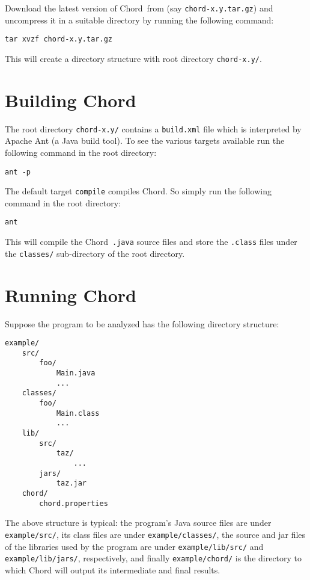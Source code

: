 \documentclass{article}
\providecommand\Chord{{Chord}}
\begin{document}
Download the latest version of \Chord\ from 
(say {\tt chord-x.y.tar.gz}) and uncompress it in a suitable directory by running the following command:

\begin{verbatim}
tar xvzf chord-x.y.tar.gz
\end{verbatim}

This will create a directory structure with root directory {\tt chord-x.y/}.

\texonly{\newpage}
\section{Building Chord}

The root directory {\tt chord-x.y/} contains a {\tt build.xml} file which is interpreted by
Apache Ant (a Java build tool).
To see the various targets available run the following command in the root directory:

\begin{verbatim}
ant -p
\end{verbatim}

The default target {\tt compile} compiles \Chord.  So simply run the following command in the
root directory:

\begin{verbatim}
ant
\end{verbatim}

This will compile the \Chord\ {\tt .java} source files and store the {\tt .class} files
under the {\tt classes/} sub-directory of the root directory.

\texonly{\newpage}
\section{Running Chord}

Suppose the program to be analyzed has the following directory structure:

\begin{verbatim}
example/
    src/
        foo/
            Main.java
            ...
    classes/
        foo/
            Main.class
            ...
    lib/
        src/
            taz/
                ...
        jars/
            taz.jar
    chord/
        chord.properties
\end{verbatim}

The above structure is typical: the program's Java source files are under {\tt example/src/}, its class files
are under {\tt example/classes/}, the source and jar files of the libraries used by the program are under
{\tt example/lib/src/} and {\tt example/lib/jars/}, respectively, and finally {\tt example/chord/} is the directory
to which Chord will output its intermediate and final results.
\end{document}
